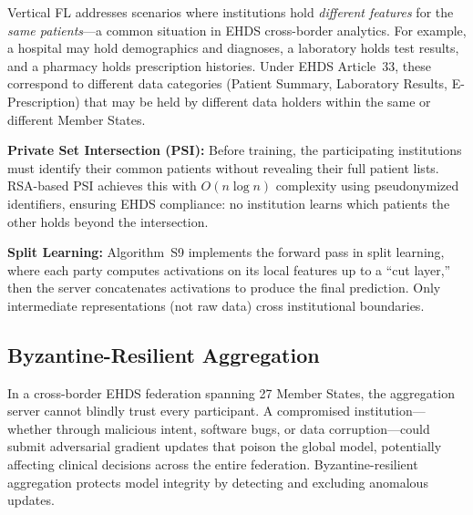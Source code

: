 \documentclass[conference]{IEEEtran}
\begin{document}
Vertical FL addresses scenarios where institutions hold \textit{different features} for the \textit{same patients}---a common situation in EHDS cross-border analytics. For example, a hospital may hold demographics and diagnoses, a laboratory holds test results, and a pharmacy holds prescription histories. Under EHDS Article~33, these correspond to different data categories (Patient Summary, Laboratory Results, E-Prescription) that may be held by different data holders within the same or different Member States.

\textbf{Private Set Intersection (PSI):} Before training, the participating institutions must identify their common patients without revealing their full patient lists. RSA-based PSI achieves this with $O(n \log n)$ complexity using pseudonymized identifiers, ensuring EHDS compliance: no institution learns which patients the other holds beyond the intersection.

\textbf{Split Learning:} Algorithm~S9 implements the forward pass in split learning, where each party computes activations on its local features up to a ``cut layer,'' then the server concatenates activations to produce the final prediction. Only intermediate representations (not raw data) cross institutional boundaries.

\begin{figure}[htbp]
\centering
{}
\end{figure}

\subsection{Byzantine-Resilient Aggregation}

In a cross-border EHDS federation spanning 27 Member States, the aggregation server cannot blindly trust every participant. A compromised institution---whether through malicious intent, software bugs, or data corruption---could submit adversarial gradient updates that poison the global model, potentially affecting clinical decisions across the entire federation. Byzantine-resilient aggregation protects model integrity by detecting and excluding anomalous updates.
\end{document}

